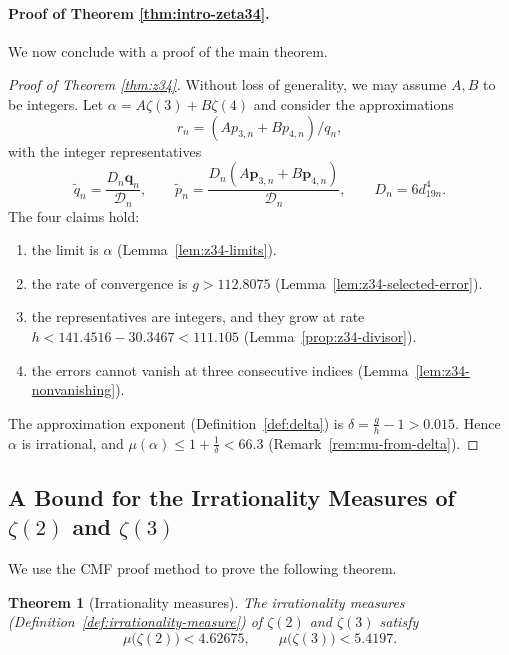 \documentclass[oneside,english,11pt]{amsart}
\newtheorem{theorem}[thm]{Theorem}
\begin{document}
\paragraph{Proof of Theorem \ref{thm:intro-zeta34}.}

We now conclude with a proof of the main theorem.
\begin{proof}[Proof of Theorem \ref{thm:z34}]
Without loss of generality, we may assume $A, B$ to be integers. Let $\alpha=A\zeta(3)+B\zeta(4)$ and consider the approximations 
\[
r_n=(Ap_{3,n}+Bp_{4,n})/q_n,
\] 
with the integer representatives
\[
  \widetilde q_n=\frac{D_n\mathbf q_n}{\mathcal D_n},\qquad
  \widetilde p_n=\frac{D_n(A\mathbf p_{3,n}+B\mathbf p_{4,n})}{\mathcal D_n},
  \qquad D_n=6d_{19n}^4 .
\]
The four claims hold:
\begin{enumerate}
\item the limit is $\alpha$ (Lemma~\ref{lem:z34-limits}).
\item the rate of convergence is $g>112.8075$
  (Lemma~\ref{lem:z34-selected-error}).
\item the representatives are integers, and they grow at rate
  $h<141.4516-30.3467<111.105$ 
  (Lemma~\ref{prop:z34-divisor}).
\item the errors cannot vanish at three consecutive indices
  (Lemma~\ref{lem:z34-nonvanishing}).
\end{enumerate}
The approximation exponent (Definition~\ref{def:delta}) is $\delta=\frac gh-1>0.015$. Hence $\alpha$ is irrational, and $\mu(\alpha)\le1+\frac1\delta<66.3$ (Remark~\ref{rem:mu-from-delta}).
\end{proof}


\subsection{A Bound for the Irrationality Measures of
\texorpdfstring{$\zeta(2)$ and $\zeta(3)$}{ζ(2) and ζ(3)}}
\label{subsec:z23}
We use the CMF proof method to prove the following theorem.

\begin{theorem}[Irrationality measures]\label{thm:z23-measures}
The irrationality measures (Definition~\ref{def:irrationality-measure}) of
$\zeta(2)$ and $\zeta(3)$ satisfy
\[
  \mu\bigl(\zeta(2)\bigr)<4.62675,
  \qquad
  \mu\bigl(\zeta(3)\bigr)<5.4197 .
\]
\end{theorem}

\end{document}
